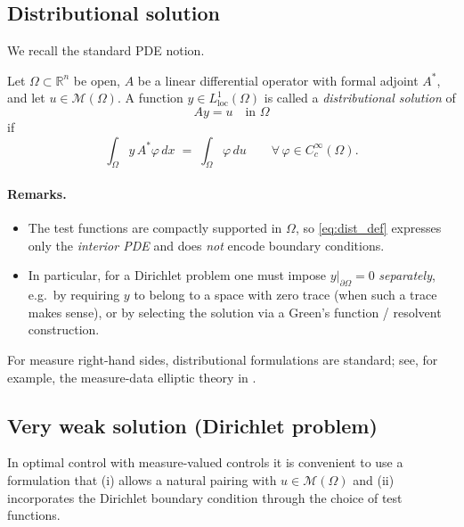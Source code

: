 \documentclass[11pt,a4paper]{article}
\begin{document}
\subsection*{Distributional solution}
We recall the standard PDE notion.

\begin{definition}\label{def:distributional}
Let $\Omega\subset\mathbb{R}^n$ be open, $A$ be a linear differential operator with formal adjoint $A^*$,
and let $u\in\mathcal{M}(\Omega)$.
A function $y\in L^1_{\mathrm{loc}}(\Omega)$ is called a \emph{distributional solution} of
\[
Ay=u \quad\text{in }\Omega
\]
if
\begin{equation}\label{eq:dist_def}
\int_\Omega y\,A^*\varphi\,dx \;=\; \int_\Omega \varphi\,du
\qquad \forall\,\varphi\in C_c^\infty(\Omega).
\end{equation}
\end{definition}

\paragraph{Remarks.}
\begin{itemize}
\item The test functions are compactly supported in $\Omega$, so \eqref{eq:dist_def} expresses only the
      \emph{interior PDE} and does \emph{not} encode boundary conditions.
\item In particular, for a Dirichlet problem one must impose $y|_{\partial\Omega}=0$ \emph{separately},
      e.g.\ by requiring $y$ to belong to a space with zero trace (when such a trace makes sense),
      or by selecting the solution via a Green's function / resolvent construction.
\end{itemize}
For measure right-hand sides, distributional formulations are standard; see, for example,
the measure-data elliptic theory in \cite{ponceEMS}.%

\subsection*{Very weak solution (Dirichlet problem)}
In optimal control with measure-valued controls it is convenient to use a formulation
that (i) allows a natural pairing with $u\in\mathcal{M}(\Omega)$ and (ii) incorporates the
Dirichlet boundary condition through the choice of test functions.
\end{document}
